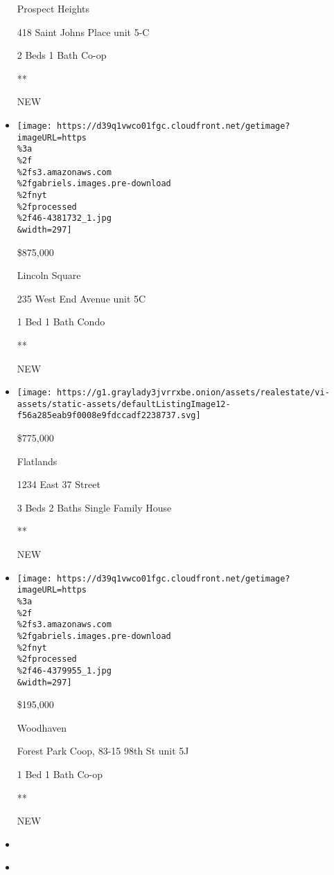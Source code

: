 \begin{itemize}
  Prospect Heights

  418 Saint Johns Place unit 5-C

  2 Beds \textbar{} 1 Bath \textbar{} Co-op

  **

  NEW
\item
  \href{/real-estate/usa/ny/new-york/lincoln-square/homes-for-sale/235-west-end-avenue/46-4381732?}{}

  \texttt{[image: https://d39q1vwco01fgc.cloudfront.net/getimage?imageURL=https\\\%3a\\\%2f\\\%2fs3.amazonaws.com\\\%2fgabriels.images.pre-download\\\%2fnyt\\\%2fprocessed\\\%2f46-4381732\_1.jpg\\\&width=297]}

  \$875,000

  Lincoln Square

  235 West End Avenue unit 5C

  1 Bed \textbar{} 1 Bath \textbar{} Condo

  **

  NEW
\item
  \href{/real-estate/usa/ny/brooklyn/flatlands/homes-for-sale/1234-east-37-street/15055-5535909?}{}

  \texttt{[image: https://g1.graylady3jvrrxbe.onion/assets/realestate/vi-assets/static-assets/defaultListingImage12-f56a285eab9f0008e9fdccadf2238737.svg]}

  \$775,000

  Flatlands

  1234 East 37 Street

  3 Beds \textbar{} 2 Baths \textbar{} Single Family House

  **

  NEW
\item
  \href{/real-estate/usa/ny/queens/woodhaven/homes-for-sale/forest-park-coop-83-15-98th-st/46-4379955?}{}

  \texttt{[image: https://d39q1vwco01fgc.cloudfront.net/getimage?imageURL=https\\\%3a\\\%2f\\\%2fs3.amazonaws.com\\\%2fgabriels.images.pre-download\\\%2fnyt\\\%2fprocessed\\\%2f46-4379955\_1.jpg\\\&width=297]}

  \$195,000

  Woodhaven

  Forest Park Coop, 83-15 98th St unit 5J

  1 Bed \textbar{} 1 Bath \textbar{} Co-op

  **

  NEW
\item
\item
  \href{/real-estate/usa/ny/new-york/harlem/homes-for-sale/102-west-123rd-street/12436-OLRS-0048859?}{}


\end{itemize}
